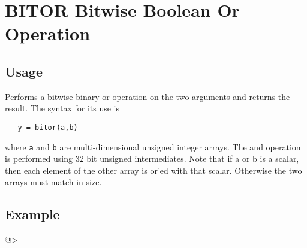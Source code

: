 \section{BITOR Bitwise Boolean Or Operation}

\subsection{Usage}

Performs a bitwise binary or operation on the two arguments and
returns the result.  The syntax for its use is
\begin{verbatim}
   y = bitor(a,b)
\end{verbatim}
where \verb|a| and \verb|b| are multi-dimensional unsigned integer arrays.
The and operation is performed using 32 bit unsigned intermediates.  Note that if a
or b is a scalar, then each element of the other array is or'ed with
that scalar.  Otherwise the two arrays must match in size.
\subsection{Example}

@>
